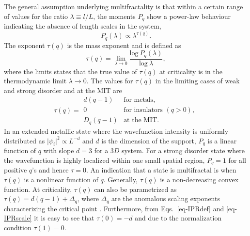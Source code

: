 The general assumption underlying multifractality is that within a certain range
of values for the ratio $\lambda\equiv l/L$, the moments
$P_q$ show a power-law behaviour indicating the absence of length scales in the
system,\cite{Jan94a}
%
\begin{equation}
	\label{eq-IPRscale}
	P_q (\lambda)\propto\lambda^{\tau(q)}.
\end{equation}
%
The exponent $\tau(q)$ is the mass exponent and is defined as
%
\begin{equation}
 	\tau(q)=\lim_{\lambda\rightarrow0}
\frac{\mathrm{log}~P_q(\lambda)}{\mathrm{log}~\lambda},
\end{equation}
where the limits states that the true value of $\tau(q)$ at
criticality is in the thermodynamic limit $\lambda\rightarrow0$.
The values for $\tau(q)$ in the limiting cases of weak and strong disorder and
at the MIT are
%
\begin{equation}
	\tau(q) = 
	\begin{array}{ll}
	d (q-1) & \textrm{for metals,}\\
	0 & \textrm{for insulators }(q>0),\\
	D_q (q-1) & \textrm{at the MIT}.
	\end{array}
\end{equation}
%
In an extended metallic state where the wavefunction intensity is uniformly
distributed as $\vert\psi_i\vert^2\propto L^{-d}$ and $d$ is the dimension of
the support, $P_q$ is a linear function of $q$ with slope $d=3$ for a $3D$
system.  For a strong disorder state where the wavefunction is highly localized
within one small spatial region, $P_q=1$ for all positive $q$'s and hence $\tau=0$.  An
indication that a state is multifractal is when $\tau(q)$ is a nonlinear
function of $q$.  Generally, $\tau(q)$ is a non-decreasing convex function.
At criticality, $\tau(q)$ can also be parametrized as
$\tau(q)=d(q-1)+\Delta_q$, where $\Delta_q$ are the anomalous scaling exponents
characterizing the critical point \cite{EveMM08}.  Furthermore, from
Eqs.~\eqref{eq-IPRdef} and \eqref{eq-IPRscale} it is easy to see that $\tau(0)=-d$
and due to the normalization condition $\tau(1)=0$.


